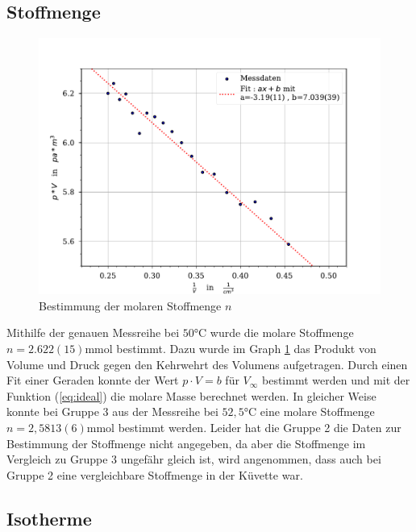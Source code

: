 \documentclass[11pt, a4paper]{article}
\begin{document}
    \subsection{Stoffmenge}
    \begin{figure}
        \centering
        \includegraphics[width=\textwidth]{./Plots/3Plot_n.pdf}

        \caption{Bestimmung der molaren Stoffmenge $n$}
        \label{fig:n}
    \end{figure}
    
    Mithilfe der genauen Messreihe bei $50 \si{\celsius}$ wurde die molare Stoffmenge $n = 2.622(15) \si{\milli\mole}$ bestimmt.
    Dazu wurde im Graph \ref{fig:n} das Produkt von Volume und Druck gegen den Kehrwehrt des Volumens aufgetragen. Durch einen Fit einer
    Geraden konnte der Wert $p \cdot V = b$ für $V_{\infty}$ bestimmt werden und mit der Funktion (\ref{eq:ideal}) die molare Masse berechnet werden.
    In gleicher Weise konnte bei Gruppe 3 aus der Messreihe bei $52,5 \si{\celsius}$  eine molare Stoffmenge
    $n = 2,5813(6) \si{\milli\mole}$ bestimmt werden. Leider hat die Gruppe 2 die Daten zur Bestimmung der Stoffmenge nicht angegeben, da aber
    die Stoffmenge im Vergleich zu Gruppe 3 ungefähr gleich ist, wird angenommen, dass auch bei Gruppe 2 eine vergleichbare Stoffmenge
    in der Küvette war.

    \subsection{Isotherme}
    
\end{document}
